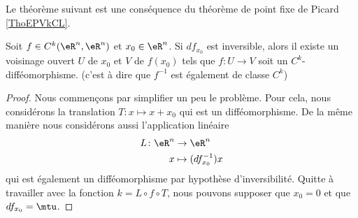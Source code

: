 Le théorème suivant est une conséquence du théorème de point fixe de Picard \ref{ThoEPVkCL}.
\begin{theorem} \label{ThoXWpzqCn}
    Soit \( f\in C^k(\eR^n,\eR^n)\) et \( x_0\in \eR^n\). Si \( df_{x_0}\) est inversible, alors il existe un voisinage ouvert \( U\) de \( x_0\) et \( V\) de \( f(x_0)\) tels que \( f\colon U\to V\) soit un \( C^k\)-difféomorphisme. (c'est à dire que \( f^{-1}\) est également de classe \( C^k\))
\end{theorem}

\begin{proof}
    Nous commençons par simplifier un peu le problème. Pour cela, nous considérons la translation \( T\colon x\mapsto x+x_0 \) qui est  un difféomorphisme. De la même manière nous considérons aussi l'application linéaire
    \begin{equation}
        \begin{aligned}
            L\colon \eR^n&\to \eR^n \\
            x&\mapsto (df_{x_0}^{-1})x
        \end{aligned}
    \end{equation}
    qui est également un difféomorphisme par hypothèse d'inversibilité. Quitte à travailler avec la fonction \( k=L\circ f\circ T\), nous pouvons supposer que \( x_0=0\) et que \( df_{x_0}=\mtu\).


\end{proof}
